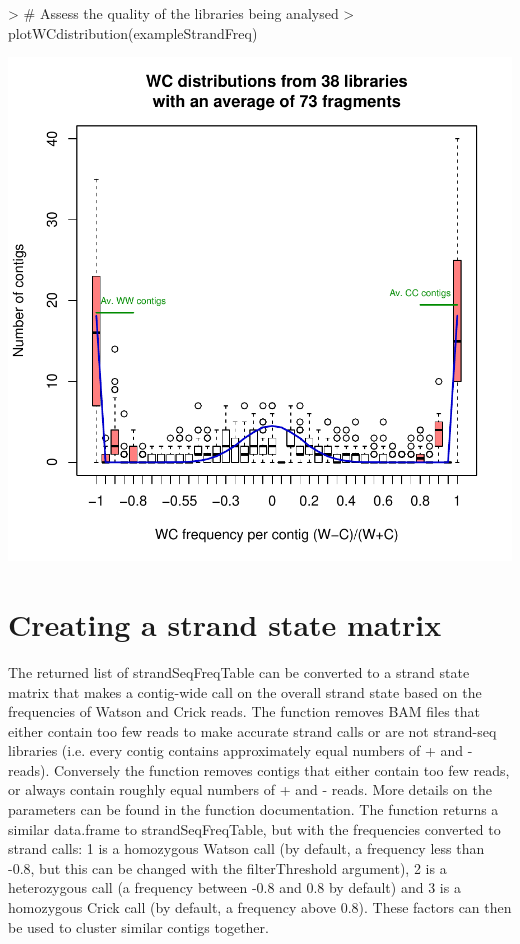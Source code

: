 \documentclass{article}
\begin{document}
\begin{Schunk}
\begin{Sinput}
> # Assess the quality of the libraries being analysed
> plotWCdistribution(exampleStrandFreq)
\end{Sinput}
\end{Schunk}
\includegraphics{contiBAIT-strandSeqFreqTableExamplec}

\section{Creating a strand state matrix}

The returned list of strandSeqFreqTable can be converted to a strand state matrix that makes a contig-wide call on the overall strand state based on the frequencies of Watson and Crick reads. The function removes BAM files that either contain too few reads to make accurate strand calls or are not strand-seq libraries (i.e. every contig contains approximately equal numbers of + and - reads). Conversely the function removes contigs that either contain too few reads, or always contain roughly equal numbers of + and - reads.  More details on the parameters can be found in the function documentation.  The function returns a similar data.frame to strandSeqFreqTable, but with the frequencies converted to strand calls: 1 is a homozygous Watson call (by default, a frequency less than -0.8, but this can be changed with the filterThreshold argument), 2 is a heterozygous call (a frequency between -0.8 and 0.8 by default) and 3 is a homozygous Crick call (by default, a frequency above 0.8).  These factors can then be used to cluster similar contigs together.\\
\end{document}
